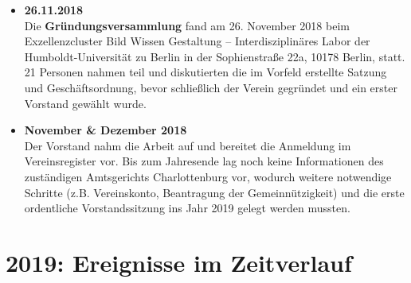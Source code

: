 \begin{itemize}
 \item \textbf{26.11.2018}\\
  Die \textbf{Gründungsversammlung} fand am 26. November 2018 beim Exzellenzcluster Bild Wissen Gestaltung -- Interdisziplinäres Labor der Humboldt-Universität zu Berlin in der Sophienstraße 22a, 10178 Berlin, statt.
  21 Personen nahmen teil und diskutierten die im Vorfeld erstellte Satzung und Geschäftsordnung, bevor schließlich der Verein gegründet und ein erster Vorstand gewählt wurde.
 \item \textbf{November \& Dezember 2018}\\
  Der Vorstand nahm die Arbeit auf und bereitet die Anmeldung im Vereinsregister vor.
  Bis zum Jahresende lag noch keine Informationen des zuständigen Amtsgerichts Charlottenburg vor, wodurch weitere notwendige Schritte (z.B. Vereinskonto, Beantragung der Gemeinnützigkeit) und die erste ordentliche Vorstandssitzung ins Jahr 2019 gelegt werden mussten.
\end{itemize}

\section{2019: Ereignisse im Zeitverlauf}

